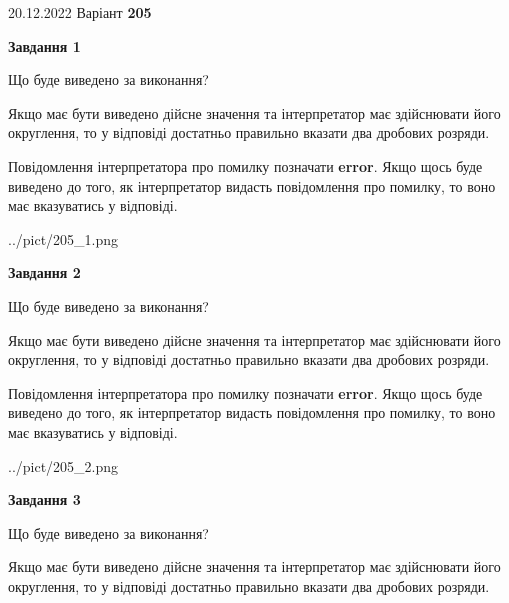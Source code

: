 \documentclass[12pt, ukrainian]{article}
\begin{document}
{20.12.2022 Варіант \No \textbf { 205 }\par}
{
\begin {Large}

{\begin {center}\textbf{Завдання 1}\end {center}}\par
Що буде виведено за виконання? \par

Якщо має бути виведено дійсне значення та інтерпретатор має здійснювати його округлення, 
то у відповіді достатньо правильно вказати два дробових розряди.

Повідомлення інтерпретатора про помилку позначати \textbf{error}.
Якщо щось буде виведено до того, як інтерпретатор видасть повідомлення про помилку, 
то воно має вказуватись у відповіді. \par

\begin{center}
	{../pict/205_1.png}
\end{center}
\newpage

{\begin {center}\textbf{Завдання 2}\end {center}}\par
Що буде виведено за виконання? \par

Якщо має бути виведено дійсне значення та інтерпретатор має здійснювати його округлення, 
то у відповіді достатньо правильно вказати два дробових розряди.

Повідомлення інтерпретатора про помилку позначати \textbf{error}.
Якщо щось буде виведено до того, як інтерпретатор видасть повідомлення про помилку, 
то воно має вказуватись у відповіді. \par

\begin{center}
	{../pict/205_2.png}
\end{center}
\newpage

{\begin {center}\textbf{Завдання 3}\end {center}}\par
Що буде виведено за виконання? \par

Якщо має бути виведено дійсне значення та інтерпретатор має здійснювати його округлення, 
то у відповіді достатньо правильно вказати два дробових розряди.


\end{Large}}
\end{document}
